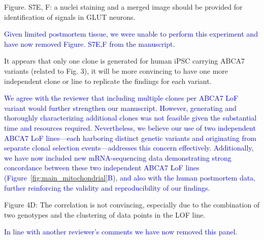 Figure. S7E, F: a nuclei staining and a merged image should be provided for identification of signals in GLUT neurons.

\textcolor{blue}{Given limited postmortem tissue, we were unable to perform this experiment and have now removed Figure. S7E,F from the manuscript.}

It appears that only one clone is generated for human iPSC carrying ABCA7 variants (related to Fig. 3), it will be more convincing to have one more independent clone or line to replicate the findings for each variant.

\textcolor{blue}{We agree with the reviewer that including multiple clones per ABCA7 LoF variant would further strengthen our manuscript. However, generating and thoroughly characterizing additional clones was not feasible given the substantial time and resources required. Nevertheless, we believe our use of two independent ABCA7 LoF lines—each harboring distinct genetic variants and originating from separate clonal selection events—addresses this concern effectively. Additionally, we have now included new mRNA-sequencing data demonstrating strong concordance between these two independent ABCA7 LoF lines (Figure~\ref{fig:main_mitochondrial}B), and also with the human postmortem data, further reinforcing the validity and reproducibility of our findings.}

Figure 4D: The correlation is not convincing, especially due to the combination of two genotypes and the clustering of data points in the LOF line.

\textcolor{blue}{In line with another reviewer’s comments we have now removed this panel.}


